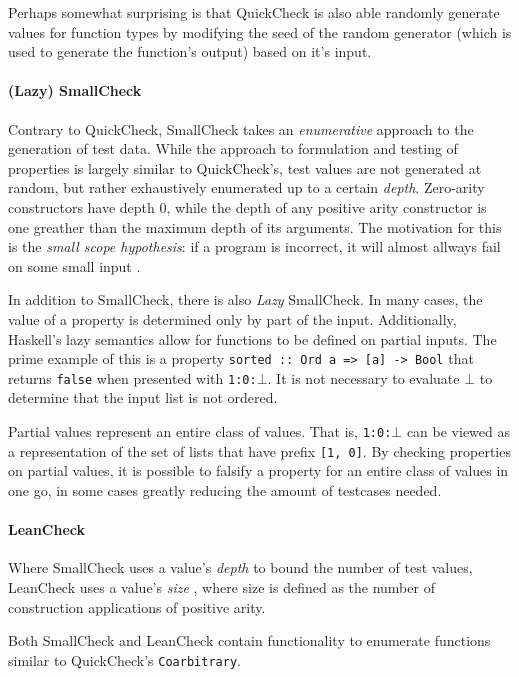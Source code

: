 \documentclass[a4paper,msc,twosized=semi]{uustthesis}
\begin{document}
    Perhaps somewhat surprising is that QuickCheck is also able randomly generate values for function types by modifying the seed of the random generator (which is used to generate the function's output) based on it's input. 

    \paragraph{(Lazy) SmallCheck} Contrary to QuickCheck, SmallCheck \cite{runciman2008smallcheck} takes an \textit{enumerative} approach to the generation of test data. While the approach to formulation and testing of properties is largely similar to QuickCheck's, test values are not generated at random, but rather exhaustively enumerated up to a certain \textit{depth}. Zero-arity constructors have depth $0$, while the depth of any positive arity constructor is one greather than the maximum depth of its arguments.  The motivation for this is the \textit{small scope hypothesis}: if a program is incorrect, it will almost allways fail on some small input \cite{andoni2003evaluating}. 

    In addition to SmallCheck, there is also \textit{Lazy} SmallCheck. In many cases, the value of a property is determined only by part of the input. Additionally, Haskell's lazy semantics allow for functions to be defined on partial inputs. The prime example of this is a property \texttt{sorted :: Ord a => [a] -> Bool} that returns \texttt{false} when presented with \texttt{1:0:$\bot$}. It is not necessary to evaluate $\bot$ to determine that the input list is not ordered. 

    Partial values represent an entire class of values. That is, \texttt{1:0:$\bot$} can be viewed as a representation of the set of lists that have prefix \texttt{[1, 0]}. By checking properties on partial values, it is possible to falsify a property for an entire class of values in one go, in some cases greatly reducing the amount of testcases needed. 

    \paragraph{LeanCheck} Where SmallCheck uses a value's \textit{depth} to bound the number of test values, LeanCheck uses a value's \textit{size} \cite{matela2017tools}, where size is defined as the number of construction applications of positive arity.

    Both SmallCheck and LeanCheck contain functionality to enumerate functions similar to QuickCheck's \texttt{Coarbitrary}. 
\end{document}
